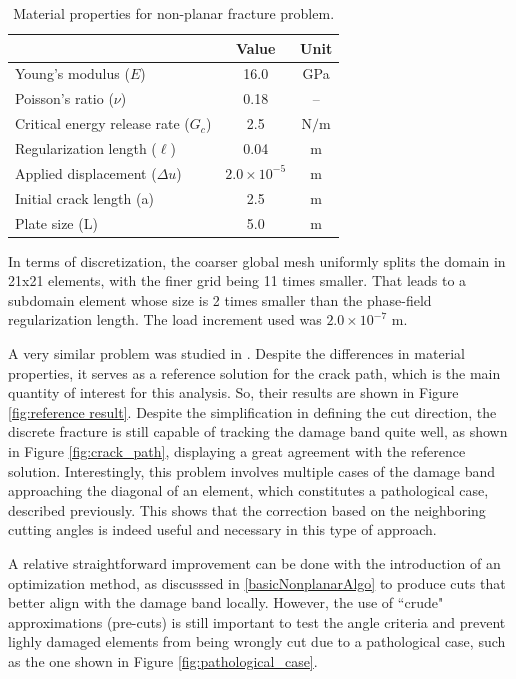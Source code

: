 \begin{table}[h]
    \centering
    \caption{Material properties for non-planar fracture problem.}
    \begin{tabular}[t]{lcc}
    \hline
    &Value &Unit \\
    \hline
    Young's modulus ($E$)&16.0&GPa\\
    Poisson's ratio ($\nu$)&0.18&--\\
    Critical energy release rate ($G_c$)&2.5&$\text{N/m}$\\
    Regularization length ($\ell$)&0.04&$\text{m}$\\
    Applied displacement ($\Delta u$)&$2.0\times 10^{-5}$&$\text{m}$\\
    Initial crack length (a)&2.5&$\text{m}$\\
    Plate size (L)&5.0&$\text{m}$\\
    \hline
    \end{tabular}
    \label{material properties nonplanar}
\end{table}%

In terms of discretization, the coarser global mesh uniformly splits the domain in 21x21 elements, with the finer grid being 11 times smaller. That leads to a subdomain element whose size is 2 times smaller than the phase-field regularization length. The load increment used was $2.0\times 10^{-7}$ m. 

A very similar problem was studied in \cite{giovanardi2017hybrid}. Despite the differences in material properties, it serves as a reference solution for the crack path, which is the main quantity of interest for this analysis. So, their results are shown in Figure \ref{fig:reference result}. Despite the simplification in defining the cut direction, the discrete fracture is still capable of tracking the damage band quite well, as shown in Figure \ref{fig:crack_path}, displaying a great agreement with the reference solution. Interestingly, this problem involves multiple cases of the damage band approaching the diagonal of an element, which constitutes a pathological case, described previously. This shows that the correction based on the neighboring cutting angles is indeed useful and necessary in this type of approach.

A relative straightforward improvement can be done with the introduction of an optimization method, as discusssed in \ref{basicNonplanarAlgo} to produce cuts that better align with the damage band locally. However, the use of ``crude" approximations (pre-cuts) is still important to test the angle criteria and prevent lighly damaged elements from being wrongly cut due to a pathological case, such as the one shown in Figure \ref{fig:pathological_case}.

